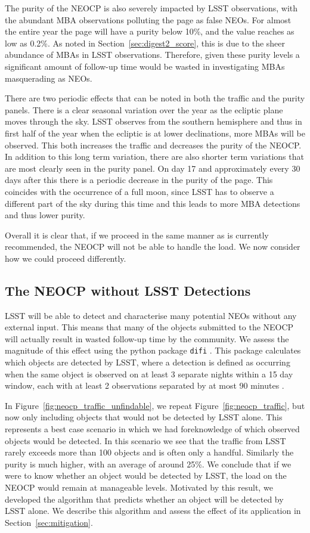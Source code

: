 \documentclass[twocolumn]{aastex631}
\begin{document}
The purity of the NEOCP is also severely impacted by LSST observations, with the abundant MBA observations polluting the page as false NEOs. For almost the entire year the page will have a purity below 10\%, and the value reaches as low as 0.2\%. As noted in Section~\ref{sec:digest2_score}, this is due to the sheer abundance of MBAs in LSST observations. Therefore, given these purity levels a significant amount of follow-up time would be wasted in investigating MBAs masquerading as NEOs.

There are two periodic effects that can be noted in both the traffic and the purity panels. There is a clear seasonal variation over the year as the ecliptic plane moves through the sky. LSST observes from the southern hemisphere and thus in first half of the year when the ecliptic is at lower declinations, more MBAs will be observed. This both increases the traffic and decreases the purity of the NEOCP. In addition to this long term variation, there are also shorter term variations that are most clearly seen in the purity panel. On day 17 and approximately every 30 days after this there is a periodic decrease in the purity of the page. This coincides with the occurrence of a full moon, since LSST has to observe a different part of the sky during this time and this leads to more MBA detections and thus lower purity.

Overall it is clear that, if we proceed in the same manner as is currently recommended, the NEOCP will not be able to handle the load. We now consider how we could proceed differently.

\subsection{The NEOCP without LSST Detections}\label{sec:no_LSST_detections}

LSST will be able to detect and characterise many potential NEOs without any external input. This means that many of the objects submitted to the NEOCP will actually result in wasted follow-up time by the community. We assess the magnitude of this effect using the python package \texttt{difi} \citep{difi}. This package calculates which objects are detected by LSST, where a detection is defined as occurring when the same object is observed on at least 3 separate nights within a 15 day window, each with at least 2 observations separated by at most 90 minutes \citep{oss}.

In Figure~\ref{fig:neocp_traffic_unfindable}, we repeat Figure~\ref{fig:neocp_traffic}, but now only including objects that would not be detected by LSST alone. This represents a best case scenario in which we had foreknowledge of which observed objects would be detected. In this scenario we see that the traffic from LSST rarely exceeds more than 100 objects and is often only a handful. Similarly the purity is much higher, with an average of around 25\%. We conclude that if we were to know whether an object would be detected by LSST, the load on the NEOCP would remain at manageable levels. Motivated by this result, we developed the algorithm that predicts whether an object will be detected by LSST alone. We describe this algorithm and assess the effect of its application in Section~\ref{sec:mitigation}.
\end{document}
